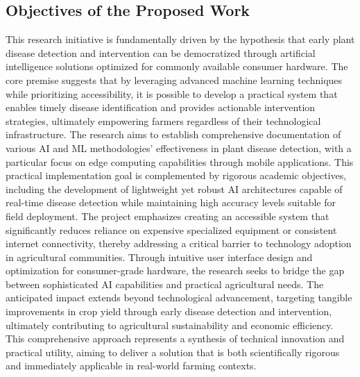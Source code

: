 \subsection{ Objectives of the Proposed Work}


This research initiative is fundamentally driven by the hypothesis that early plant disease detection and intervention can be democratized through artificial intelligence solutions optimized for commonly available consumer hardware. The core premise suggests that by leveraging advanced machine learning techniques while prioritizing accessibility, it is possible to develop a practical system that enables timely disease identification and provides actionable intervention strategies, ultimately empowering farmers regardless of their technological infrastructure. The research aims to establish comprehensive documentation of various AI and ML methodologies' effectiveness in plant disease detection, with a particular focus on edge computing capabilities through mobile applications. This practical implementation goal is complemented by rigorous academic objectives, including the development of lightweight yet robust AI architectures capable of real-time disease detection while maintaining high accuracy levels suitable for field deployment. The project emphasizes creating an accessible system that significantly reduces reliance on expensive specialized equipment or consistent internet connectivity, thereby addressing a critical barrier to technology adoption in agricultural communities. Through intuitive user interface design and optimization for consumer-grade hardware, the research seeks to bridge the gap between sophisticated AI capabilities and practical agricultural needs. The anticipated impact extends beyond technological advancement, targeting tangible improvements in crop yield through early disease detection and intervention, ultimately contributing to agricultural sustainability and economic efficiency. This comprehensive approach represents a synthesis of technical innovation and practical utility, aiming to deliver a solution that is both scientifically rigorous and immediately applicable in real-world farming contexts.

